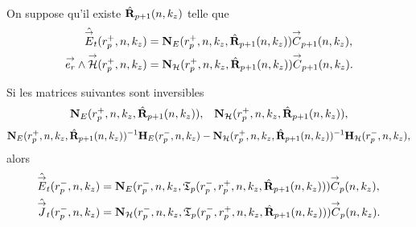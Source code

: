     \begin{prop}%
      \label{prop:cylindre:transfert:reflexion}{}~

      On suppose qu'il existe \(\hat{\mathbf{R}}_{p+1}(n,k_z)\) telle que 
      \begin{align*}
        \hat{{\overset{\rightarrow}{E}}}_t(r_{p}^+,n,k_z) &= \mathbf{N}_{E}(r_p^+,n,k_z,\hat{\mathbf{R}}_{p+1}(n,k_z)){\overset{\rightarrow}{C}}_{p+1}(n,k_z),
        \\
        {\overset{\rightarrow}{e_r}}\wedge{\overset{\rightarrow}{\mathcal{H}}}(r_{p}^+,n,k_z) &= \mathbf{N}_{\mathcal{H}}(r_p^+,n,k_z,\hat{\mathbf{R}}_{p+1}(n,k_z)){\overset{\rightarrow}{C}}_{p+1}(n,k_z).
      \end{align*}

      Si les matrices suivantes sont inversibles
      \begin{align*}
        \mathbf{N}_{E}(r_p^+,n,k_z,\hat{\mathbf{R}}_{p+1}(n,k_z)), && \mathbf{N}_{\mathcal{H}}(r_p^+,n,k_z,\hat{\mathbf{R}}_{p+1}(n,k_z)),
      \end{align*}
      \begin{align*}
        \mathbf{N}_{E}(r_p^+,n,k_z,\hat{\mathbf{R}}_{p+1}(n,k_z))^{-1}\mathbf{H}_{E}(r_p^-,n,k_z) - \mathbf{N}_{\mathcal{H}}(r_p^+,n,k_z,\hat{\mathbf{R}}_{p+1}(n,k_z))^{-1}\mathbf{H}_{\mathcal{H}}(r_p^-,n,k_z),
      \end{align*}
      alors
      \begin{align*}
        \hat{{\overset{\rightarrow}{E}}}_t(r_{p}^-,n,k_z) &= \mathbf{N}_{E}(r_p^-,n,k_z,\mathfrak{T}_p(r_p^-,r_p^+,n,k_z,\hat{\mathbf{R}}_{p+1}(n,k_z))){\overset{\rightarrow}{C}}_{p}(n,k_z),
        \\
        \hat{{\overset{\rightarrow}{J}}}_t(r_{p}^-,n,k_z) &= \mathbf{N}_{\mathcal{H}}(r_p^-,n,k_z,\mathfrak{T}_p(r_p^-,r_p^+,n,k_z,\hat{\mathbf{R}}_{p+1}(n,k_z))){\overset{\rightarrow}{C}}_{p}(n,k_z).
      \end{align*}
    \end{prop}

